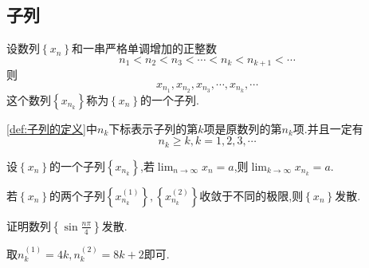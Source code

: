 \subsection{子列}
\begin{formal}
    \begin{definition}[子列的定义]\label{def:子列的定义}
        设数列$\left\{x_n\right\}$和一串严格单调增加的正整数\[
        n_1<n_2<n_3<\cdots<n_k<n_{k+1}<\cdots
        \]则\[
        x_{n_1},x_{n_2},x_{n_3},\cdots,x_{n_k},\cdots
        \]这个数列$\left\{x_{n_k}\right\}$称为$\left\{x_n\right\}$的一个子列.
    \end{definition}
\end{formal}
\begin{red}
    \begin{remark}
        \cref{def:子列的定义}中$n_k$下标表示子列的第$k$项是原数列的第$n_k$项.并且一定有\[
        n_k\geqslant k,k=1,2,3,\cdots
        \]
    \end{remark}
\end{red}
\begin{formal}
    \begin{theorem}[子列收敛]\label{thm:子列收敛}
        设$\left\{x_n\right\}$的一个子列$\left\{x_{n_k}\right\}$,若$\displaystyle\lim_{n\to\infty}x_n=a$,则$\displaystyle\lim_{k\to\infty}x_{n_k}=a$.
    \end{theorem}
\end{formal}
\begin{green}
    \begin{corollary}[子列极限不同]\label{cor:子列极限不同}
        若$\left\{x_n\right\}$的两个子列$\left\{x_{n_k}^{\left(1\right)}\right\},\left\{x_{n_k}^{\left(2\right)}\right\}$收敛于不同的极限,则$\left\{x_n\right\}$发散.
    \end{corollary}
\end{green}
\begin{brown}
    \begin{example}
        证明数列$\displaystyle\left\{\sin\frac{n\pi}{4}\right\}$发散.
    \end{example}
    \begin{Proof}
        取$n_k^{\left(1\right)}=4k,n_k^{\left(2\right)}=8k+2$即可.
    \end{Proof}
\end{brown}

